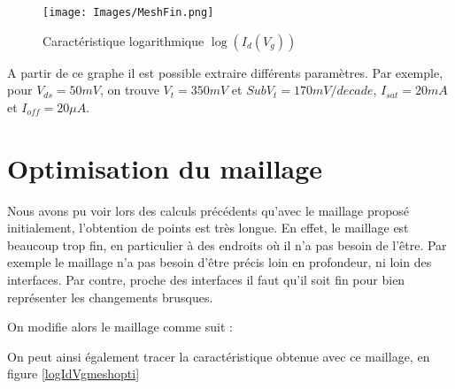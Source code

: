\documentclass[a4paper,11pt]{report}
\begin{document}
\begin{figure}[H]
\centering
    \texttt{[image: Images/MeshFin.png]}
    \caption{Caractéristique logarithmique $\log(I_d(V_g))$}
    \label{logIdVgmeshfin}
\end{figure}

A partir de ce graphe il est possible extraire différents paramètres. Par exemple, pour $V_{ds}=50mV$, on trouve $V_t=350mV$ et $SubV_t=170mV/decade$, $I_{sat}=20mA$ et $I_{off}=20\mu A$.

\section{Optimisation du maillage}

Nous avons pu voir lors des calculs précédents qu'avec le maillage proposé initialement, l'obtention de points est très longue. En effet, le maillage est beaucoup trop fin, en particulier à des endroits où il n'a pas besoin de l'être. Par exemple le maillage n'a pas besoin d'être précis loin en profondeur, ni loin des interfaces. Par contre, proche des interfaces il faut qu'il soit fin pour bien représenter les changements brusques.
 
\vspace{0.3cm}

On modifie alors le maillage comme suit :
\vspace{0.3cm}

\noindent{}
\vspace{0.3cm}

On peut ainsi également tracer la caractéristique obtenue avec ce maillage, en figure \ref{logIdVgmeshopti}
\end{document}

